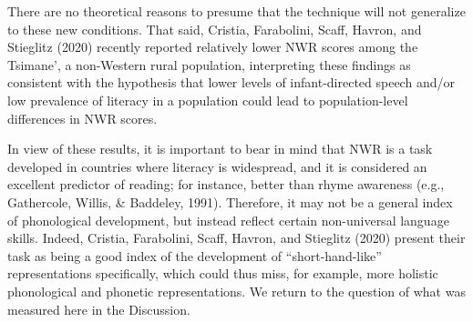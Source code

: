 \documentclass[
  american,
  ,man,floatsintext]{apa6}
\begin{document}
There are no theoretical reasons to presume that the technique will not generalize to these new conditions. That said, Cristia, Farabolini, Scaff, Havron, and Stieglitz (2020) recently reported relatively lower NWR scores among the Tsimane', a non-Western rural population, interpreting these findings as consistent with the hypothesis that lower levels of infant-directed speech and/or low prevalence of literacy in a population could lead to population-level differences in NWR scores.

In view of these results, it is important to bear in mind that NWR is a task developed in countries where literacy is widespread, and it is considered an excellent predictor of reading; for instance, better than rhyme awareness (e.g., Gathercole, Willis, \& Baddeley, 1991). Therefore, it may not be a general index of phonological development, but instead reflect certain non-universal language skills. Indeed, Cristia, Farabolini, Scaff, Havron, and Stieglitz (2020) present their task as being a good index of the development of ``short-hand-like'' representations specifically, which could thus miss, for example, more holistic phonological and phonetic representations. We return to the question of what was measured here in the Discussion.
\end{document}
